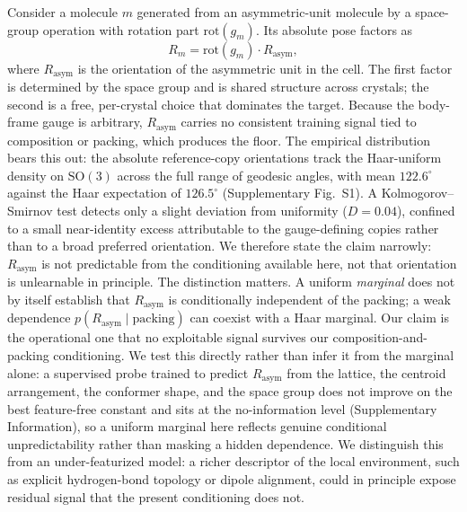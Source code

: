\documentclass[11pt]{article}
\begin{document}
Consider a molecule $m$ generated from an asymmetric-unit molecule by a
space-group operation with rotation part $\mathrm{rot}(g_m)$. Its absolute pose
factors as
\begin{equation}
R_m = \mathrm{rot}(g_m)\cdot R_{\text{asym}},
\label{eq:decomp}
\end{equation}
where $R_{\text{asym}}$ is the orientation of the asymmetric unit in the cell.
The first factor is determined by the space group and is shared structure across
crystals; the second is a free, per-crystal choice that dominates the target.
Because the body-frame gauge is arbitrary, $R_{\text{asym}}$ carries no
consistent training signal tied to composition or packing, which produces the
floor. The empirical distribution bears this out: the absolute reference-copy
orientations track the Haar-uniform density on $\mathrm{SO}(3)$ across the full
range of geodesic angles, with mean $122.6^\circ$ against the Haar expectation of
$126.5^\circ$ (Supplementary Fig.~S1). A Kolmogorov--Smirnov test detects only a
slight deviation from uniformity ($D=0.04$), confined to a small near-identity
excess attributable to the gauge-defining copies rather than to a broad preferred
orientation. We therefore state the claim narrowly: $R_{\text{asym}}$ is not
predictable from the conditioning available here, not that orientation is
unlearnable in principle. The distinction matters. A uniform \emph{marginal}
does not by itself establish that $R_{\text{asym}}$ is conditionally
independent of the packing; a weak dependence $p(R_{\text{asym}}\mid\text{packing})$
can coexist with a Haar marginal. Our claim is the operational one that no
exploitable signal survives our composition-and-packing conditioning. We test
this directly rather than infer it from the marginal alone: a supervised probe
trained to predict $R_{\text{asym}}$ from the lattice, the centroid arrangement,
the conformer shape, and the space group does not improve on the best
feature-free constant and sits at the no-information level (Supplementary
Information), so a uniform marginal here reflects genuine conditional
unpredictability rather than masking a hidden dependence. We distinguish this
from an under-featurized model: a richer descriptor of the local environment,
such as explicit hydrogen-bond topology or dipole alignment, could in principle
expose residual signal that the present conditioning does not.
\end{document}

